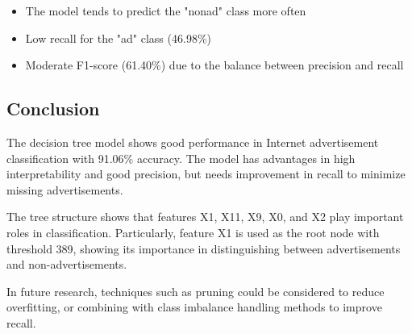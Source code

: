 \begin{itemize}
    \item The model tends to predict the "nonad" class more often
    \item Low recall for the "ad" class (46.98\%)
    \item Moderate F1-score (61.40\%) due to the balance between precision and recall
\end{itemize}

\subsection{Conclusion}

The decision tree model shows good performance in Internet advertisement classification with 91.06\% accuracy. The model has advantages in high interpretability and good precision, but needs improvement in recall to minimize missing advertisements.

The tree structure shows that features X1, X11, X9, X0, and X2 play important roles in classification. Particularly, feature X1 is used as the root node with threshold 389, showing its importance in distinguishing between advertisements and non-advertisements.

In future research, techniques such as pruning could be considered to reduce overfitting, or combining with class imbalance handling methods to improve recall.